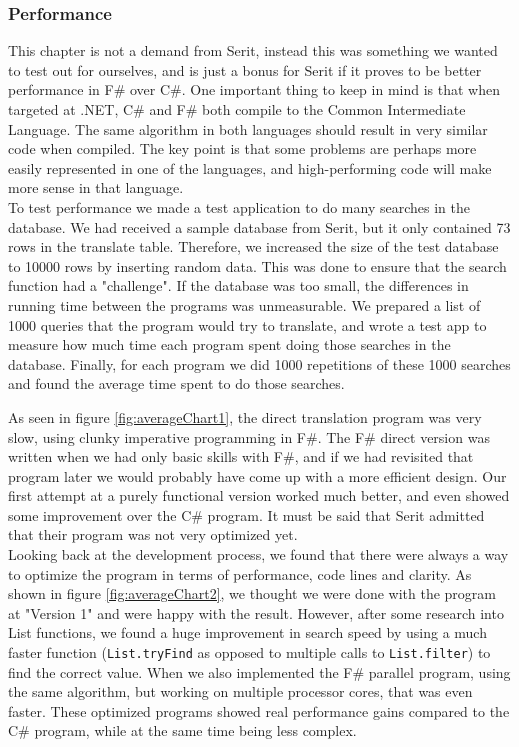 \documentclass[12pt, a4paper]{article}
\newcommand{\code}[1]{{\small \texttt{#1}}}
\begin{document}
\subsubsection{Performance}
\label{sTranslatePerformance}
This chapter is not a demand from Serit, instead this was something we wanted to test out for ourselves, and is just a bonus for Serit if it proves to be better performance in F\# over C\#. One important thing to keep in mind is that when targeted at .NET, C\# and F\# both compile to the Common Intermediate Language. The same algorithm in both languages should result in very similar code when compiled. The key point is that some problems are perhaps more easily represented in one of the languages, and high-performing code will make more sense in that language.\\

To test performance we made a test application to do many searches in the database. We had received a sample database from Serit, but it only contained 73 rows in the translate table. Therefore, we increased the size of the test database to 10000 rows by inserting random data. This was done to ensure that the search function had a "challenge". If the database was too small, the differences in running time between the programs was unmeasurable. We prepared a list of 1000 queries that the program would try to translate, and wrote a test app to measure how much time each program spent doing those searches in the database. Finally, for each program we did 1000 repetitions of these 1000 searches and found the average time spent to do those searches.\\

\newpage

As seen in figure \ref{fig:averageChart1}, the direct translation program was very slow, using clunky imperative programming in F\#. The F\# direct version was written when we had only basic skills with F\#, and if we had revisited that program later we would probably have come up with a more efficient design. Our first attempt at a purely functional version worked much better, and even showed some improvement over the C\# program. It must be said that Serit admitted that their program was not very optimized yet.\\

Looking back at the development process, we found that there were always a way to optimize the program in terms of performance, code lines and clarity. As shown in figure \ref{fig:averageChart2}, we thought we were done with the program at "Version 1" and were happy with the result. However, after some research into List functions, we found a huge improvement in search speed by using a much faster function (\code{List.tryFind} as opposed to multiple calls to \code{List.filter}) to find the correct value. When we also implemented the F\# parallel program, using the same algorithm, but working on multiple processor cores, that was even faster. These optimized programs showed real performance gains compared to the C\# program, while at the same time being less complex.\\
\end{document}
